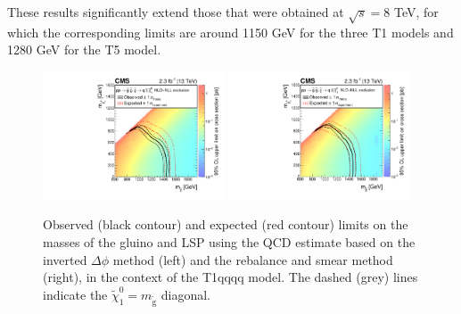 These results significantly extend those that were
obtained at $\sqrt{s}=8$ TeV,
for which the corresponding limits are around
1150 GeV \cite{Chatrchyan:2013wxa,Chatrchyan:2014lfa} for the
three T1 models and 1280 GeV \cite{Chatrchyan:2014lfa} for the T5 model.
\begin{figure}[tb!]
\centering
    \includegraphics[width=0.48\textwidth]{figures/SusySearches/Ra2b2015/SMSqqqqXSEC.pdf}
    \includegraphics[width=0.48\textwidth]{figures/SusySearches/Ra2b2015/SMSqqqqXSEC_rps.pdf}
    \caption{Observed (black contour) and expected (red contour) limits on the masses of the gluino and LSP using the QCD estimate based on the inverted $\Delta\phi$ method (left) and the rebalance and smear method (right), in the context of the T1qqqq model. The dashed (grey) lines indicate the $\tilde{\chi}^{0}_{1}=m_{\tilde{\text{g}}}$ diagonal.}
    \label{fig:limitsT1qqqq}
\end{figure}
